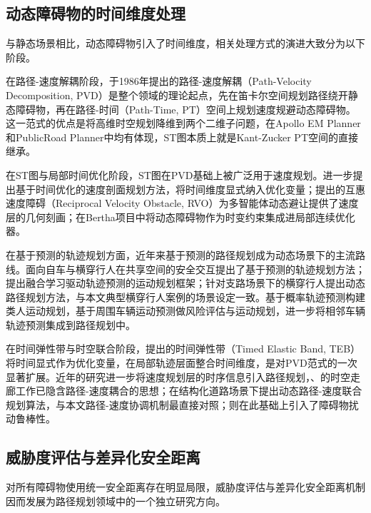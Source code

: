 \subsection{动态障碍物的时间维度处理}

与静态场景相比，动态障碍物引入了时间维度，相关处理方式的演进大致分为以下阶段。

在路径-速度解耦阶段，\citet{kant1986pvd}于1986年提出的路径-速度解耦（Path-Velocity Decomposition, PVD）是整个领域的理论起点，先在笛卡尔空间规划路径绕开静态障碍物，再在路径-时间（Path-Time, PT）空间上规划速度规避动态障碍物。这一范式的优点是将高维时空规划降维到两个二维子问题，在Apollo EM Planner\cite{fan2018baidu}和PublicRoad Planner中均有体现，ST图本质上就是Kant-Zucker PT空间的直接继承。

在ST图与局部时间优化阶段，ST图在PVD基础上被广泛用于速度规划。\citet{liu2017speed}进一步提出基于时间优化的速度剖面规划方法，将时间维度显式纳入优化变量；\citet{vandenberg2008rvo}提出的互惠速度障碍（Reciprocal Velocity Obstacle, RVO）为多智能体动态避让提供了速度层的几何刻画；\citet{ziegler2014}在Bertha项目中将动态障碍物作为时变约束集成进局部连续优化器。

在基于预测的轨迹规划方面，近年来基于预测的路径规划成为动态场景下的主流路线。\citet{yangbo2023ped}面向自车与横穿行人在共享空间的安全交互提出了基于预测的轨迹规划方法；\citet{jeong2021ml}提出融合学习驱动轨迹预测的运动规划框架；\citet{crossingped2019}针对支路场景下的横穿行人提出动态路径规划方法，与本文典型横穿行人案例的场景设定一致。\citet{humanlikepred2022}基于概率轨迹预测构建类人运动规划，\citet{survrisk2020}基于周围车辆运动预测做风险评估与运动规划，\citet{adjpred2025}进一步将相邻车辆轨迹预测集成到路径规划中。

在时间弹性带与时空联合阶段，\citet{rosmann2012teb,rosmann2013sparse}提出的时间弹性带（Timed Elastic Band, TEB）将时间显式作为优化变量，在局部轨迹层面整合时间维度，是对PVD范式的一次显著扩展。近年的研究进一步将速度规划层的时序信息引入路径规划，\citet{yang2025stcorridor}、\citet{qiao2025stjoint}的时空走廊工作已隐含路径-速度耦合的思想；\citet{pathspeedstructured2024}在结构化道路场景下提出动态路径-速度联合规划算法，与本文路径-速度协调机制最直接对照；\citet{li2025perturbation}则在此基础上引入了障碍物扰动鲁棒性。

\subsection{威胁度评估与差异化安全距离}

对所有障碍物使用统一安全距离存在明显局限，威胁度评估与差异化安全距离机制因而发展为路径规划领域中的一个独立研究方向。

